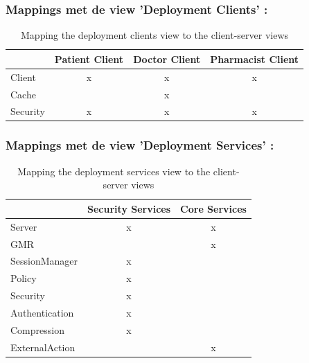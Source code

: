 \documentclass[a4paper,10pt]{article}
\begin{document}
\subsubsection{Mappings met de view 'Deployment Clients' : }
\begin{table}[h!]
\begin{center}
 \begin{tabular}{l| c | c | c |} 
 & Patient Client & Doctor Client & Pharmacist Client \\ \hline
Client & x & x & x \\ \hline
\hspace{6pt}Cache & & x & \\ \hline
\hspace{6pt}Security & x & x & x \\ \hline
\end{tabular}
\caption{Mapping the deployment clients view to the client-server views}
\end{center}
\end{table}

\subsubsection{Mappings met de view 'Deployment Services' : }
\begin{table}[h!]
\begin{center}
 \begin{tabular}{l| c | c |} 
 & Security Services & Core Services \\ \hline
Server & x & x \\ \hline
\hspace{6pt}GMR & & x \\ \hline
\hspace{6pt}SessionManager & x & \\ \hline
\hspace{6pt}Policy & x & \\ \hline
\hspace{6pt}Security & x & \\ \hline
\hspace{12pt}Authentication & x & \\ \hline
\hspace{12pt}Compression & x & \\ \hline
\hspace{6pt}ExternalAction & & x \\ \hline
\end{tabular}
\caption{Mapping the deployment services view to the client-server views}
\end{center}
\end{table}
\end{document}
